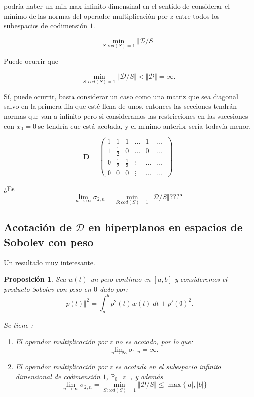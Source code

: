 \documentclass[11pt]{article}
\newtheorem{prop1}{Proposici\'{o}n}%
\newenvironment{prop}{\begin{prop1}\rm}{\end{prop1}}
\begin{document}
\noindent podría haber un min-max infinito dimensinal en el sentido de considerar el mínimo de las normas del operador multiplicación por $z$ entre todos los subespacios de codimensión $1$.

$$
  \min_{S: cod(S)=1} \Vert \mathcal{D}/S \Vert
$$

\noindent Puede ocurrir que

$$
  \min_{S: cod(S)=1} \Vert \mathcal{D}/S \Vert < \Vert \mathcal{D} \Vert = \infty.
$$

\noindent Sí, puede ocurrir, basta considerar un caso como una matriz que sea diagonal salvo en la primera fila que esté llena de unos, entonces las secciones tendrán normas que van a infinito pero si consideramos las restricciones en las sucesiones con $x_0=0$ se tendría que está acotada, y el mínimo anterior sería todavía menor.


$$
  \mathbf{D}= \begin{pmatrix}
    1 & 1           & 1           & \hdots & 1      & \hdots    \\
    1 & \frac{1}{2} & 0           & \hdots & 0      & \hdots
    \\
    0 & \frac{1}{2} & \frac{1}{3} & \vdots & \hdots & \hdots
    \\
    0 & 0           & 0           & \vdots & \hdots & \hdots  \
  \end{pmatrix}
$$


 ¿Es
$$
  \lim_{n\to \infty} \sigma_{2,n}= \min_{S: cod(S)=1} \Vert \mathcal{D}/S \Vert ????
$$
\subsection{Acotación de $\mathcal{D}$ en hiperplanos en espacios de  Sobolev con peso}

\noindent Un resultado muy interesante.

\begin{prop} Sea $w(t)$ un peso continuo en $[a,b]$ y consideremos el producto Sobolev con peso en $0$ dado por:
  $$
    \Vert p(t) \Vert^{2} = \int_{a}^{b} p^{2}(t)w(t)\; dt + p'(0)^{2}.
  $$



  \noindent Se tiene :
  \begin{enumerate}
    \item El operador multiplicación por $z$ no es acotado, por lo que:
          $$
            \lim_{n\to \infty} \sigma_{1,n} = \infty.
          $$
    \item  El operador multiplicación por $z$ es acotado en el subespacio infinito dimensional de codimensión $1$, $\mathbb{P}_{0}[z]$, y además
          $$
            \lim_{n\to \infty} \sigma_{2,n}= \min_{S: cod(S)=1} \Vert \mathcal{D}/S \Vert \leq \max\{\vert a \vert, \vert b \vert \}
          $$
  \end{enumerate}
\end{prop}
\end{document}
